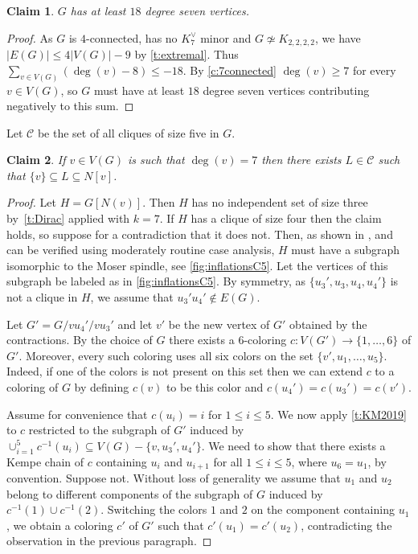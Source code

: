 \documentclass[reqno,final,12pt]{amsart}
\newtheorem{claim}{Claim}[section]
\newcommand{\mc}[1]{\mathcal{#1}}
\begin{document}
{\begin{claim}\label{c:degree7vtx}  $G$ has at least $18$ degree seven vertices.
\end{claim}	

\begin{proof}
	As $G$ is $4$-connected, has no  $K_7^{\vee}$ minor and $G \not \simeq K_{2,2,2,2}$, we have $|E(G)| \leq 4 |V(G)|-9$ by \cref{t:extremal}. Thus $\sum_{v \in V(G)} (\deg(v)-8) \leq -18$. By \cref{c:7connected} $\deg(v) \geq 7$  for every $v \in V(G)$, so $G$ must have at least $18$ degree seven vertices contributing negatively to this sum.
\end{proof}

Let $\mc{C}$ be the set of all cliques of size five in $G$.

\begin{claim}\label{c:nbrhood}  If $v \in V(G)$ is such that $\deg(v)=7$ then there exists $L \in \mc{C}$ such that $\{v\} \subseteq L \subseteq N[v]$. 
\end{claim}	

\begin{proof} 
	
Let $H=G[N(v)]$. Then $H$ has no independent set of size three by~\cref{t:Dirac} applied with $k=7$. If $H$ has a clique of size four then the claim holds, so suppose for a contradiction that it does not. Then, as shown in  \cite[Section 2]{KT2005}, and can be verified using moderately routine case analysis, $H$ must have a subgraph isomorphic to the Moser spindle, see \cref{fig:inflationsC5}. Let the vertices of this subgraph be labeled as in  \cref{fig:inflationsC5}. By symmetry, as $\{u_3',u_3,u_4,u_4'\}$ is not a clique in $H$, we assume that $u_3'u_4' \not \in E(G)$.

Let $G' = G/vu_4'/vu_3'$ and let $v'$ be the new vertex of $G'$ obtained by the contractions. By the choice of $G$ there exists a $6$-coloring $c : V(G') \to \{1,\ldots, 6\}$ of $G'$. Moreover, every such coloring uses all six colors on the set $\{v',u_1,\ldots,u_5\}$. Indeed, if one of the colors is not present on this set then we can extend $c$ to a coloring of $G$ by defining $c(v)$ to be this color  and $c(u_4')=c(u_3')=c(v')$. 

Assume for convenience that $c(u_i)=i$ for $1 \leq i \leq 5$.
We now apply \cref{t:KM2019} to $c$ restricted to the subgraph of $G'$ induced by $\cup_{i=1}^5 c^{-1}(u_i) \subseteq V(G) - \{v,u_3',u_4'\}$. We need to show that there exists a Kempe chain of $c$ containing  $u_i$ and $u_{i+1}$  for all $1 \leq i \leq 5$, where  $u_6=u_1$, by convention. Suppose not. Without loss of generality we assume that $u_1$ and $u_2$ belong to different components of the subgraph of $G$ induced by $c^{-1}(1) \cup c^{-1}(2)$. Switching the colors $1$ and $2$  on the component containing $u_1$, we obtain a coloring $c'$ of $G'$ such that $c'(u_1)=c'(u_2)$, contradicting the observation in the previous paragraph.


\end{proof}}
\end{document}
